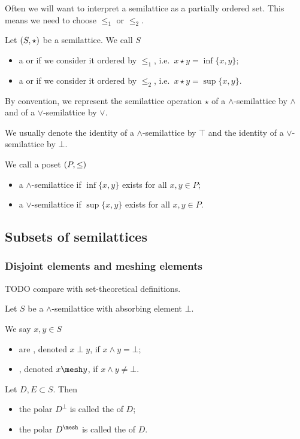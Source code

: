 Often we will want to interpret a semilattice as a partially ordered set. This means we need to choose $\leq_1$ or $\leq_2$.
\begin{definition}
Let $\left( S,\star \right)$ be a semilattice. We call $S$
\begin{itemize}
\item a  or  if we consider it ordered by $\leq_1$, i.e.\ $x\star y = \inf\{x,y\}$;
\item a  or  if we consider it ordered by $\leq_2$, i.e.\ $x\star y = \sup\{x,y\}$.
\end{itemize}
By convention, we represent the semilattice operation $\star$ of a $\wedge$-semilattice by $\wedge$ and of a $\vee$-semilattice by $\vee$.

We usually denote the identity of a $\wedge$-semilattice by $\top$ and the identity of a $\vee$-semilattice by $\bot$.
\end{definition}

We call a poset $\left( P,\leq \right)$
\begin{itemize}
\item a $\wedge$-semilattice if $\inf\{x,y\}$ exists for all $x,y\in P$;
\item a $\vee$-semilattice if $\sup\{x,y\}$ exists for all $x,y\in P$.
\end{itemize}

\subsection{Subsets of semilattices}
\subsubsection{Disjoint elements and meshing elements}
TODO compare with set-theoretical definitions.
\begin{definition}
Let $S$ be a $\wedge$-semilattice with absorbing element $\bot$.

We say $x,y\in S$
\begin{itemize}
\item are , denoted $x \perp y$, if $x\wedge y = \bot$;
\item {}, denoted $x\mesh y$, if $x\wedge y \neq \bot$.
\end{itemize}

Let $D, E \subset S$. Then
\begin{itemize}
\item the polar $D^\perp$ is called the  of $D$;
\item the polar $D^{\mesh}$ is called the  of $D$.
\end{itemize}
\end{definition}

